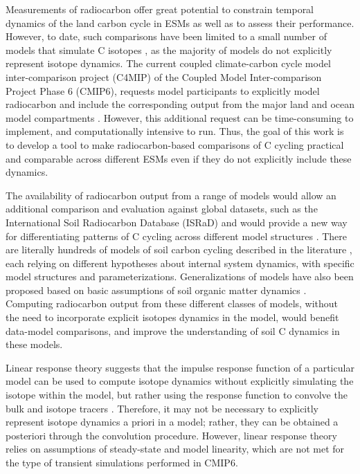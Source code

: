 \documentclass[11pt,a4paper]{article}
\begin{document}
Measurements of radiocarbon offer great potential to constrain temporal dynamics of the land carbon cycle in ESMs as well as to assess their performance. However, to date, such comparisons have been limited to a small number of models that simulate C isotopes \citep[e.g.][]{Koven2013, Tifafi2018,Chen2009JGR}, as the majority of models do not explicitly represent isotope dynamics. The current coupled climate-carbon cycle model inter-comparison project (C4MIP) of the Coupled Model Inter-comparison Project Phase 6 (CMIP6), requests model participants to explicitly model radiocarbon and include the corresponding output from the major land and ocean model compartments \citep{Jones2016, Graven2017}. However, this additional request can be time-consuming to implement, and computationally intensive to run. Thus, the goal of this work is to develop a tool to make radiocarbon-based comparisons of C cycling practical and comparable across different ESMs even if they do not explicitly include these dynamics.

The availability of radiocarbon output from a range of models would allow an additional comparison and evaluation against global datasets, such as the International Soil Radiocarbon Database (ISRaD) \citep{He2016, Mathieu2015, Lawrence2019} and would provide a new way for differentiating patterns of C cycling across different model structures \citep{Sierra2014}. There are literally hundreds of models of soil carbon cycling described in the literature \citep{Manzoni2009SBB}, each relying on different hypotheses about internal system dynamics, with specific model structures and parameterizations. Generalizations of models have also been proposed based on basic assumptions of soil organic matter dynamics \citep{Sierra2015}. Computing radiocarbon output from these different classes of models, without the need to incorporate explicit isotopes dynamics in the model, would benefit data-model comparisons, and improve the understanding of soil C dynamics in these models.

Linear response theory suggests that the impulse response function of a particular model can be used to compute isotope dynamics without explicitly simulating the isotope within the model, but rather using the response function to convolve the bulk and isotope tracers \citep{Thompson1999}. Therefore, it may not be necessary to explicitly represent isotope dynamics a priori in a model; rather, they can be obtained a posteriori through the convolution procedure. However, linear response theory relies on assumptions of steady-state and model linearity, which are not met for the type of transient simulations performed in CMIP6. 
\end{document}
